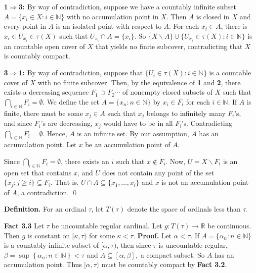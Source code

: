 \documentclass{article}
\begin{document}
\vskip 15pt




\textbf{1$\Rightarrow $3:} By way of contradiction, suppose we have a countably infinite subset $A=\{x_i\in X: i\in \mathbb{N}\}$ with no accumulation point in $X$. Then $A$ is closed in $X$ and every point in  $A$ is an isolated point with respect to $A$. For each $x_i\in A$, there is $x_i \in U_{x_i}\in \tau(X)$ such that $U_{x_i} \cap A = \{x_i\}$. So $\{X\backslash A\} \cup \{U_{x_i} \in \tau(X): i\in \mathbb{N}\}$ is an countable open cover of $X$ that yields no finite subcover, contradicting that $X$ is countably compact. 

\vskip 15pt


\textbf{3$\Rightarrow$1:} By way of contradiction, suppose that  $\{U_i\in \tau(X): i\in \mathbb{N}\}$ is a countable cover of $X$ with no finite subcover. Then, by the equivalence of \textbf{1} and \textbf{2}, there exists a decreasing sequence $F_1\supset F_2\cdots $ of nonempty closed subsets of $X$ such that $\bigcap_{i\in \mathbb{N}} F_i =\emptyset$. We define the set $A=\{x_n: n\in \mathbb{N}\}$ by $x_i\in F_i$ for each $i\in \mathbb{N}$. If $A$ is finite, there must be some $x_j\in A$ such that $x_j$ belongs to infinitely many $F_i$'s, and since $F_i$'s are decreasing, $x_j$ would have to be in all $F_i$'s. Contradicting $\bigcap_{i\in \mathbb{N}} F_i=\emptyset$. 
Hence, $A$ is an infinite set. By our assumption, $A$ has an accumulation point. Let $x$ be an accumulation point of $A$.

\vskip 10pt
Since $\bigcap_{i\in \mathbb{N}} F_i =\emptyset$, there exists an $i$ such that $x\notin F_i$. Now, $U=X\backslash F_i$ is an open set that contains $x$, and $U$ does not contain any point of the set $\{x_j: j\geq i\}\subseteq F_i$.  That is, $U\cap A \subseteq \{x_1,\dots, x_i\}$ and $x$ is not an accumulation point of $A$, a contradiction.   \qed






\vskip 40pt

\textbf{Definition. } For an ordinal $\tau$, let $T(\tau)$ denote the space of ordinals less than $\tau$. 

\vskip 25pt


\textbf{Fact 3.3} Let $\tau$ be uncountable regular cardinal. Let $g: T(\tau)\rightarrow \mathbb{R}$ be continuous.
Then  $g$ is constant on $[\kappa, \tau)$ for some $\kappa<\tau$.
\vskip 15pt
\textbf{Proof.}
Let $\alpha<\tau$. If $A=\{\alpha_n: n\in \mathbb{N}\}$ is a countably infinite subset of $[\alpha,\tau)$, then since $\tau$ is uncountable regular, $\beta=\sup \left\{\alpha_n: n\in \mathbb{N}\right\}<\tau$ and $A\subseteq [\alpha, \beta],$ a compact subset.
 So $A$ has an accumulation point. Thus $[\alpha,\tau)$ must be countably compact by \textbf{Fact 3.2}.
\end{document}
